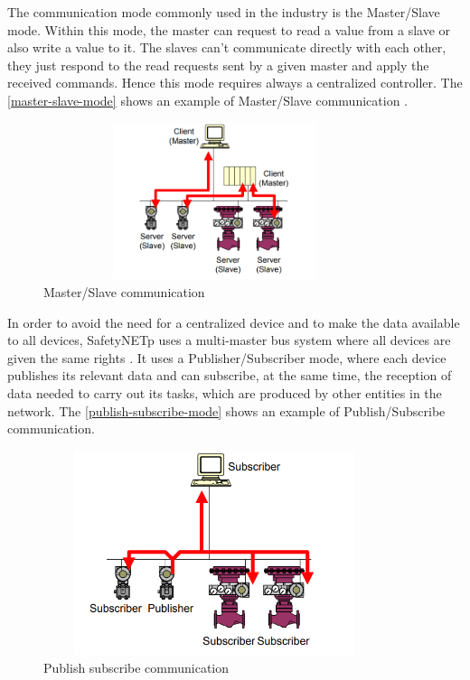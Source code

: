 The communication mode commonly used in the industry is the Master/Slave mode. Within
this mode, the master can request to read a value from a slave or also write a value to it.
The slaves can't communicate directly with each other, they just respond to the read
requests sent by a given master and apply the received commands. Hence this mode
requires always a centralized controller. The \autoref{master-slave-mode} shows an example
of Master/Slave communication \cite{JonasFieldbus}.

\begin{figure}[H]
\centering
\includegraphics[width=10cm,height=4.6cm]{figures/safetynetp/master-slave-mode.png}
\caption[Master/Slave communication]{Master/Slave communication \cite{JonasFieldbus}}\label{master-slave-mode}
\end{figure}

In order to avoid the need for a centralized device and to make the data available to
all devices, SafetyNETp uses a multi-master bus system where all devices are given the same rights \cite{zurawski2014industrial}. It uses
a Publisher/Subscriber mode, where each device publishes its relevant data and can subscribe, at the same time,
the reception of data needed to carry out its tasks, which are produced by other entities in the network.
The \autoref{publish-subscribe-mode} shows an example of Publish/Subscribe communication.

\begin{figure}[H]
\centering
\includegraphics[width=10cm,height=6cm]{figures/safetynetp/publish-subscribe-mode.png}
\caption[Publish subscribe communication]{Publish subscribe communication \cite{JonasFieldbus}}\label{publish-subscribe-mode}
\end{figure}


